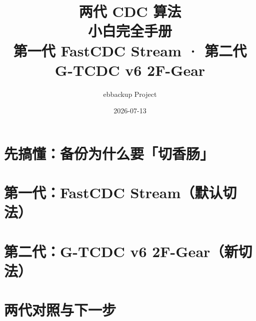 \documentclass[12pt,a4paper,openany]{ctexbook}
\title{两代 CDC 算法\\[0.3em]\large 小白完全手册\\[0.2em]\normalsize 第一代 FastCDC Stream · 第二代 G-TCDC v6 2F-Gear}
\author{ebbackup Project}
\date{2026-07-13}
\begin{document}
\frontmatter
\maketitle

\tableofcontents
\listoffigures

\mainmatter
\part{先搞懂：备份为什么要「切香肠」}



\part{第一代：FastCDC Stream（默认切法）}








\part{第二代：G-TCDC v6 2F-Gear（新切法）}






\part{两代对照与下一步}



\appendix


\backmatter
\end{document}
